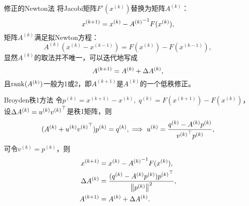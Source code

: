 \begin{theorem}
    {修正的Newton法}{}
    将Jacobi矩阵$F'(x^{(k)})$替换为矩阵$A^{(k)}$：
    \[
        x^{(k+1)}=x^{(k)}-{A^{(k)}}^{-1} F(x^{(k)}),
    \]
    矩阵$A^{(k)}$满足拟Newton方程：
    \begin{equation}
        A^{(k)}(x^{(k)}-x^{(k-1)})=F(x^{(k)})-F(x^{(k-1)}),
    \end{equation}
    显然$A^{(k)}$的取法并不唯一，可以迭代地写成
    \[
        A^{(k+1)}=A^{(k)}+\Delta A^{(k)},
    \]
    且$\operatorname{rank}(A^{(k)})$一般为1或2，即$A^{(k+1)}$是$A^{(k)}$的一个低秩修正。
\end{theorem}

\begin{theorem}
    {Broyden秩1方法}{}
    令$p^{(k)}=x^{(k+1)}-x^{(k)},\;q^{(k)}=F(x^{(k+1)})-F(x^{(k)})$，设$\Delta A^{(k)}=u^{(k)}{v^{(k)}}^\top$是秩1矩阵，则
    \[
        (A^{(k)}+u^{(k)}{v^{(k)}}^\top)p^{(k)}=q^{(k)},\implies u^{(k)}=\frac{q^{(k)}-A^{(k)}p^{(k)}}{{v^{(k)}}^\top p^{(k)}},
    \]
    可令$v^{(k)}=p^{(k)}$，则 
    \begin{subequations}
        \begin{align}
            x^{(k+1)}&=x^{(k)}-{A^{(k)}}^{-1} F(x^{(k)}),\\
            \Delta A^{(k)}&=\frac{(q^{(k)}-A^{(k)}p^{(k)}){p^{(k)}}^\top}{\left\lVert p^{(k)}\right\rVert^2},\\
            A^{(k+1)}&=A^{(k)}+\Delta A^{(k)}.
        \end{align}
    \end{subequations}
\end{theorem}
